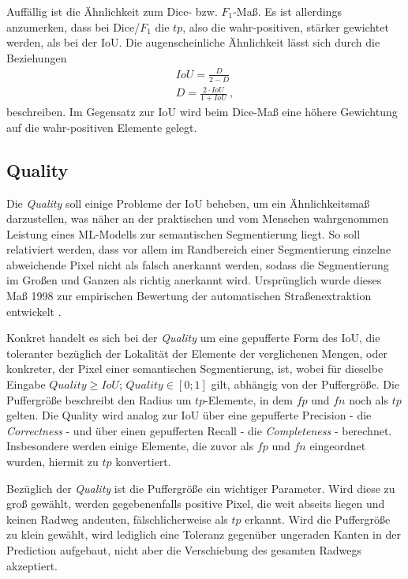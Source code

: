 Auffällig ist die Ähnlichkeit zum Dice- bzw. $F_{1}$-Maß. Es ist allerdings anzumerken, dass bei Dice/$F_1$ die $tp$, also die wahr-positiven, stärker gewichtet werden, als bei der \ac{IoU}. Die augenscheinliche Ähnlichkeit lässt sich durch die Beziehungen
\begin{align}
	\label{eq:dice-iou} IoU = \frac{D}{2 - D} \\
	D = \frac{2 \cdot IoU}{1 + IoU} ~,
\end{align}
beschreiben.
Im Gegensatz zur \ac{IoU} wird beim Dice-Maß eine höhere Gewichtung auf die wahr-positiven Elemente 
gelegt.

\subsection{Quality} \label{sec:evaluation-metrics:quality}

Die \textit{Quality} soll einige Probleme der \ac{IoU} beheben, um ein Ähnlichkeitsmaß darzustellen, 
was näher an der praktischen und vom Menschen wahrgenommen Leistung eines \ac{ML}-Modells zur semantischen Segmentierung liegt.
So soll relativiert werden, dass vor allem im Randbereich einer Segmentierung einzelne abweichende Pixel
nicht als falsch anerkannt werden, sodass die Segmentierung im Großen und Ganzen als richtig anerkannt wird. 
Ursprünglich wurde dieses Maß 1998 zur empirischen Bewertung der automatischen Straßenextraktion entwickelt \cite{ChristianWiedemann.1998}. 

Konkret handelt es sich bei der \textit{Quality} um eine gepufferte Form des \ac{IoU},
die toleranter bezüglich der Lokalität der Elemente der verglichenen Mengen, oder konkreter,
der Pixel einer semantischen Segmentierung, ist, 
wobei für dieselbe Eingabe $Quality \geq IoU$; $Quality \in [0;1]$ gilt, abhängig von der Puffergröße. 
Die Puffergröße beschreibt den Radius um $tp$-Elemente, in dem $fp$ und $fn$ noch als $tp$ gelten.   
Die Quality wird analog zur \ac{IoU} über eine gepufferte Precision - die \textit{Correctness} - 
und über einen gepufferten Recall - die \textit{Completeness} - berechnet. Insbesondere werden einige Elemente, 
die zuvor als $fp$ und $fn$ eingeordnet wurden, hiermit zu $tp$ konvertiert.

Bezüglich der \textit{Quality} ist die Puffergröße ein wichtiger Parameter.
Wird diese zu groß gewählt, werden gegebenenfalls positive Pixel, die weit abseits liegen und keinen Radweg andeuten, fälschlicherweise 
als $tp$ erkannt. Wird die Puffergröße zu klein gewählt, wird lediglich eine Toleranz gegenüber ungeraden 
Kanten in der Prediction aufgebaut, nicht aber die Verschiebung des gesamten Radwegs akzeptiert.

